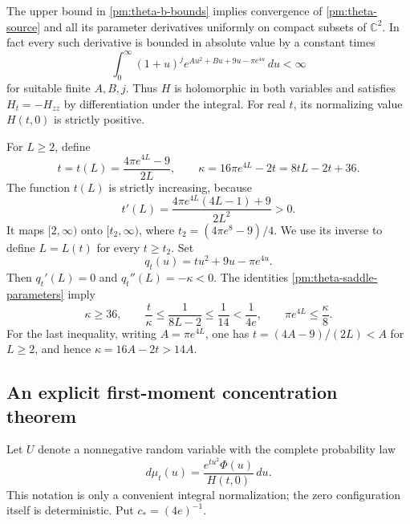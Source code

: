The upper bound in \eqref{pm:theta-b-bounds} implies convergence of
\eqref{pm:theta-source} and all its parameter derivatives uniformly on
compact subsets of \(\mathbb C^2\).  In fact every such derivative is
bounded in absolute value by a constant times
\[
 \int_0^\infty (1+u)^j
             e^{A u^2+B u+9u-\pi e^{4u}}\,du<\infty
\]
for suitable finite \(A,B,j\).  Thus \(H\) is holomorphic in both
variables and satisfies \(H_t=-H_{zz}\) by differentiation under the
integral.  For real \(t\), its normalizing value \(H(t,0)\) is
strictly positive.

For \(L\ge2\), define
\begin{equation}
 t=t(L)=\frac{4\pi e^{4L}-9}{2L},\qquad
 \kappa=16\pi e^{4L}-2t=8tL-2t+36.
 \label{pm:theta-saddle-parameters}
\end{equation}
The function \(t(L)\) is strictly increasing, because
\[
 t'(L)=\frac{4\pi e^{4L}(4L-1)+9}{2L^2}>0.
\]
It maps \([2,\infty)\) onto \([t_2,\infty)\), where
\(t_2=(4\pi e^8-9)/4\).  We use its inverse to define \(L=L(t)\)
for every \(t\ge t_2\).  Set
\begin{equation}
 q_t(u)=tu^2+9u-\pi e^{4u}.
 \label{pm:theta-q-definition}
\end{equation}
Then \(q_t'(L)=0\) and \(q_t''(L)=-\kappa<0\).  The identities
\eqref{pm:theta-saddle-parameters} imply
\begin{equation}
 \kappa\ge36,\qquad
 \frac t\kappa\le\frac1{8L-2}\le\frac1{14}<\frac1{4e},
 \qquad \pi e^{4L}\le\frac\kappa8.
 \label{pm:theta-parameter-bounds}
\end{equation}
For the last inequality, writing \(A=\pi e^{4L}\), one has
\(t=(4A-9)/(2L)<A\) for \(L\ge2\), and hence
\(\kappa=16A-2t>14A\).

\subsection{An explicit first-moment concentration theorem}
\label{pm:theta-concentration-subsection}

Let \(U\) denote a nonnegative random variable with the complete
probability law
\begin{equation}
 d\mu_t(u)=\frac{e^{tu^2}\Phi(u)}{H(t,0)}\,du.
 \label{pm:theta-probability}
\end{equation}
This notation is only a convenient integral normalization; the zero
configuration itself is deterministic.  Put \(c_*=(4e)^{-1}\).

